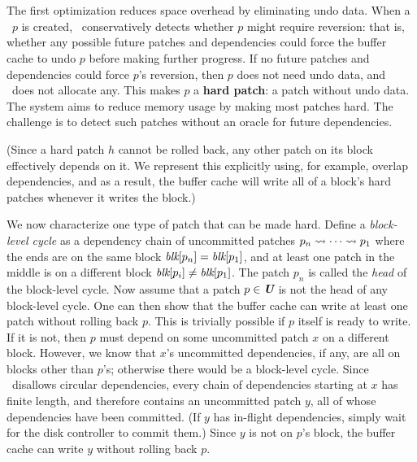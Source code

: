 
\subsection{\Nrb\ \Patches}
\label{sec:patch:nrb}

The first optimization reduces space overhead by
eliminating undo data.
%
When a \patch\ $p$ is created, \Kudos\ conservatively detects whether $p$
 might require reversion:
%
that is, whether any possible future patches and dependencies could force
 the buffer cache to undo $p$ before making further progress.
%
If no future patches and dependencies could force
 $p$'s reversion, then $p$ does not need undo data, and \Kudos\ does not
 allocate any.
%
This makes $p$ a \textbf{hard patch}: a patch without undo data.
%
The system aims to reduce memory usage by making most patches hard.
%
The challenge is to detect such patches without
 an oracle for future dependencies.
%


%
(Since a hard patch $h$ cannot be rolled back, any other patch on its block
 effectively depends on it.
%
We represent this explicitly using, for example, overlap dependencies, and
%
as a result, the buffer cache will write all of a block's hard patches
 whenever it writes the block.)


We now characterize one type of patch that can be made hard.
%
Define a \emph{block-level cycle} as a dependency chain of uncommitted
 patches $p_n \leadsto \cdots \leadsto p_1$ where the ends are on the same
 block $\textit{blk}[{p_n}] = \textit{blk}[{p_1}]$, and at least one patch in the middle
 is on a different block $\textit{blk}[{p_i}] \neq \textit{blk}[{p_1}]$.
%
The patch $p_n$ is called the \emph{head} of the block-level cycle.
%
Now assume that a patch $p \in \PMem$ is not the head of any block-level
 cycle.
%
One can then show that the buffer cache can write at least one patch
 without rolling back $p$.
%
This is trivially possible if $p$ itself is ready to write.
%
If it is not, then $p$ must depend on some uncommitted patch $x$ on a different
 block.
%
However, we know that $x$'s uncommitted dependencies, if any, are all on
 blocks other than $p$'s; otherwise there would be a block-level cycle.
%
Since \Featherstitch\ disallows circular dependencies, every
 chain of dependencies starting at $x$ has finite length, and therefore
 contains an uncommitted patch $y$, all of whose dependencies have
 been committed.
%
(If $y$ has in-flight dependencies, simply wait
 for the disk controller to commit them.)
%
Since $y$ is not on $p$'s block, the buffer cache can write $y$ without
 rolling back $p$.


